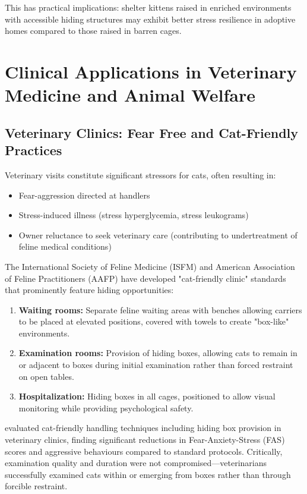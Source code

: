 \documentclass[12pt,a4paper]{article}
\begin{document}
This has practical implications: shelter kittens raised in enriched environments with accessible hiding structures may exhibit better stress resilience in adoptive homes compared to those raised in barren cages.

\section{Clinical Applications in Veterinary Medicine and Animal Welfare}

\subsection{Veterinary Clinics: Fear Free and Cat-Friendly Practices}

Veterinary visits constitute significant stressors for cats, often resulting in:

\begin{itemize}
    \item Fear-aggression directed at handlers
    \item Stress-induced illness (stress hyperglycemia, stress leukograms)
    \item Owner reluctance to seek veterinary care (contributing to undertreatment of feline medical conditions)
\end{itemize}

The International Society of Feline Medicine (ISFM) and American Association of Feline Practitioners (AAFP) have developed "cat-friendly clinic" standards \citep{rodan2016} that prominently feature hiding opportunities:

\begin{enumerate}
    \item \textbf{Waiting rooms:} Separate feline waiting areas with benches allowing carriers to be placed at elevated positions, covered with towels to create "box-like" environments.
    
    \item \textbf{Examination rooms:} Provision of hiding boxes, allowing cats to remain in or adjacent to boxes during initial examination rather than forced restraint on open tables.
    
    \item \textbf{Hospitalization:} Hiding boxes in all cages, positioned to allow visual monitoring while providing psychological safety.
\end{enumerate}

\citet{nibblett2015} evaluated cat-friendly handling techniques including hiding box provision in veterinary clinics, finding significant reductions in Fear-Anxiety-Stress (FAS) scores and aggressive behaviours compared to standard protocols. Critically, examination quality and duration were not compromised—veterinarians successfully examined cats within or emerging from boxes rather than through forcible restraint.
\end{document}
